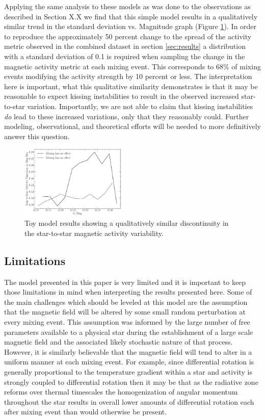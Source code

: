 Applying the same analysis to these models as was done to the observations as
described in Section {\color{red} X.X} we find that this simple model results
in a qualitatively similar trend in the standard deviation vs. Magnitude graph
(Figure \ref{fig:model}). In order to reproduce the approximately 50 percent
change to the spread of the activity metric observed in the combined dataset in
section \ref{sec:results} a distribution with a standard deviation of 0.1 is required when sampling the change in the magnetic activity metric at each mixing event. This corresponds to 68\% of mixing events modifying the activity strength by 10 percent or less. The interpretation here is important, what
this qualitative similarity demonstrates is that it may be reasonable to expect
kissing instabilities to result in the observed increased star-to-star
variation. Importantly, we are not able to claim that kissing instabilities
\textit{do} lead to these increased variations, only that they reasonably
could. Further modeling, observational, and theoretical efforts will be needed
to more definitively answer this question.

\begin{figure}
  \centering
  \includegraphics[width=0.45\textwidth]{figures/SpreadModel.pdf}
  \caption{Toy model results showing a qualitatively similar discontinuity in the star-to-star magnetic activity variability.}
  \label{fig:model}
\end{figure}

\subsection{Limitations}
The model presented in this paper is very limited and it is important to keep
those limitations in mind when interpreting the results presented here. Some of
the main challenges which should be leveled at this model are the assumption
that the magnetic field will be altered by some small random perturbation at
every mixing event. This assumption was informed by the large number of free
parameters available to a physical star during the establishment of a large
scale magnetic field and the associated likely stochastic nature of that
process. However, it is similarly believable that the magnetic field will tend
to alter in a uniform manner at each mixing event. For example, since
differential rotation is generally proportional to the temperature gradient
within a star and activity is strongly coupled to differential rotation then it
may be that as the radiative zone reforms over thermal timescales the
homogenization of angular momentum throughout the star results in overall lower
amounts of differential rotation each after mixing event than would otherwise
be present.

